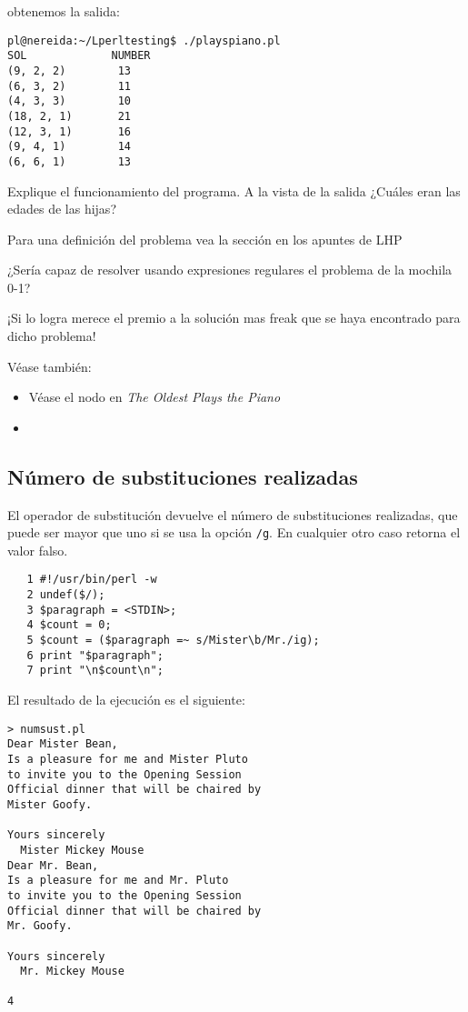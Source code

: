 \begin{exercise}
obtenemos la salida:

\begin{verbatim}
pl@nereida:~/Lperltesting$ ./playspiano.pl
SOL             NUMBER
(9, 2, 2)        13
(6, 3, 2)        11
(4, 3, 3)        10
(18, 2, 1)       21
(12, 3, 1)       16
(9, 4, 1)        14
(6, 6, 1)        13
\end{verbatim}

Explique el funcionamiento del programa. 
A la vista de la salida ¿Cuáles eran las 
edades de las hijas?
\end{exercise}


Para una definición del problema vea la sección 
en los apuntes de LHP
\begin{exercise}
¿Sería capaz de resolver usando expresiones regulares el problema de la mochila 0-1?

¡Si lo logra merece el premio a la solución mas freak que se haya encontrado para dicho problema!
\end{exercise}


Véase  también:
\begin{itemize}
\item
Véase el nodo en  \emph{The Oldest Plays the Piano}
\item
{}
\end{itemize}

\subsection{Número de substituciones realizadas}
El operador de substitución devuelve el número de substituciones
realizadas, que puede ser mayor que uno si se usa la opción
\verb|/g|. En cualquier otro caso retorna el valor falso.
\begin{verbatim}
   1 #!/usr/bin/perl -w
   2 undef($/);
   3 $paragraph = <STDIN>;
   4 $count = 0;
   5 $count = ($paragraph =~ s/Mister\b/Mr./ig);
   6 print "$paragraph";
   7 print "\n$count\n";
\end{verbatim}
El resultado de la ejecución es el siguiente:
\begin{verbatim}
> numsust.pl
Dear Mister Bean,
Is a pleasure for me and Mister Pluto
to invite you to the Opening Session
Official dinner that will be chaired by
Mister Goofy.
 
Yours sincerely
  Mister Mickey Mouse
Dear Mr. Bean,
Is a pleasure for me and Mr. Pluto
to invite you to the Opening Session
Official dinner that will be chaired by
Mr. Goofy.
 
Yours sincerely
  Mr. Mickey Mouse
 
4   
\end{verbatim}

